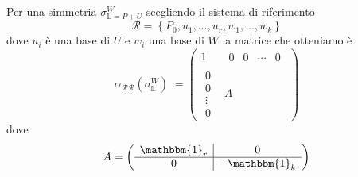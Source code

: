 \documentclass[11pt]{scrartcl}
\begin{document}
   	 \begin{example}
   	 	Per una simmetria $\sigma_{\mathbb{L}=P+U}^W$ scegliendo il sistema di riferimento
   	 	$$\mathcal{R}=\left\{P_0,u_1,\dots,u_r,w_1,\dots,w_k\right\}$$
   	 	dove $u_i$ è una base di $U$ e $w_i$ una base di $W$ la matrice che otteniamo è
   	 	$$\alpha_{\mathcal{R}\mathcal{R}}\left(\sigma_{\mathbb{L}}^W\right):=\left(\begin{array}{c|c}
   	 		1 & \begin{array}{cccc} 
   	 			0 & 0 & \cdots & 0
   	 		\end{array} \\
   	 		\hline
   	 		\begin{array}{c}
   	 			0 \\
   	 			0 \\
   	 			\vdots \\
   	 			0
   	 		\end{array} & A
   	 	\end{array}\right)$$
   	 	dove 
   	 	$$A=\left(\begin{array}{c|c}
   	 		\mathbbm{1}_r & 0 \\
   	 		\hline
   	 		0 & -\mathbbm{1}_k
   	 	\end{array}\right)$$
   	 \end{example}
   	 
\end{document}
